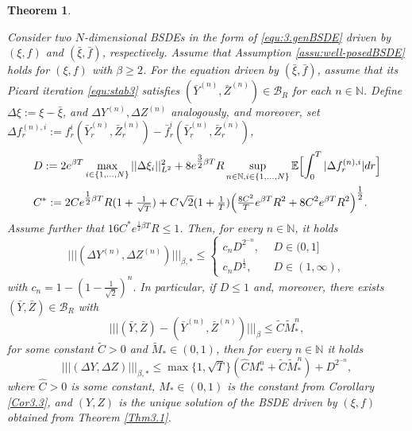 \documentclass[10pt,a4paper]{article}
\newcommand{\be}{\begin{equation}}
\newcommand{\ee}{\end{equation}}
\theoremstyle{plain}
\newtheorem{Theorem}{Theorem}[section]
\theoremstyle{definition}
\numberwithin{equation}{section}
\newcommand{\trinm}[1]{\vert\!\vert\!\vert #1 \vert\!\vert\!\vert}
\begin{document}
\begin{Theorem}
\label{Thm3.9}

Consider two $N$-dimensional BSDEs in the form of \eqref{equ:3.genBSDE} driven by $(\xi, f)$ and $(\bar \xi, \bar f)$, respectively. Assume that Assumption \ref{assu:well-posedBSDE} holds for $(\xi,f)$ with $\beta \geq 2$. For the equation driven by $(\bar \xi, \bar f)$, assume that its Picard iteration \eqref{equ:stab3} satisfies $(\bar{Y}^{(n)},\bar{Z}^{(n)}) \in \mathcal{B}_{R}$ for each $n \in \mathbb{N}$. 
Define $\Delta \xi := \xi - \bar{\xi}$, and $  \Delta Y^{(n)}, \Delta Z^{(n)}$ analogously, and moreover, set $\Delta f_{r}^{(n),i} := f_{r}^{i}(\bar{Y}_{r}^{(n)},\bar{Z}_{r}^{(n)})-\bar{f}_{r}^{i}(\bar{Y}_{r}^{(n)},\bar{Z}_{r}^{(n)})$,
\begin{align*}
&D := 2e^{\beta T}\max_{i \in \{1,...,N\}}||\Delta \xi_{i}||_{L^{2}}^{2} + 8e^{\tfrac{3}{2}\beta T}R\sup_{n \in \mathbb{N},i \in \{1,...,N\}}\mathbb{E}\Bigl[\int_{0}^{T}|\Delta f_{r}^{(n),i}|dr\Bigr] \\
&C^{*} := 2Ce^{\tfrac{1}{2}\beta T}R(1+\tfrac{1}{\sqrt{T}}) + C\sqrt{2}(1+\tfrac{1}{T})\Bigl(\tfrac{8C^{2}}{T}e^{\beta T}R^{2} + 8C^{2}e^{\beta T}R^{2}\Bigr)^{\tfrac{1}{2}}.
\end{align*}
Assume further that $16C^{*}e^{\tfrac{1}{2}\beta T}R \leq 1$. Then, for every $n \in \mathbb{N}$, it holds
\be
\trinm{(\Delta Y^{(n)}, \Delta Z^{(n)})}_{\beta,*}  \le \left\{
\begin{array}{ll}
    c_n D^{2^{-n}}, \ \ &D \in (0,1]\\
    c_n D^{\frac12}, \ \ &D \in (1,\infty), 
\end{array}\right.
\ee
with $c_n= 1-(1- \frac{1}{\sqrt 2})^n.$ In particular, if $D \leq 1$ and, moreover, there exists $(\bar Y, \bar Z) \in  \mathcal{B}_{R}$ with
\begin{equation}
\label{equ:stab5}
\trinm{(\bar{Y},\bar{Z})-(\bar{Y}^{(n)},\bar{Z}^{(n)})}_{\beta} \leq \tilde{C}\tilde{M}_{*}^{n},
\end{equation}
for some constant $\tilde{C}>0$ and $\tilde{M}_{*} \in (0,1)$,
then for every $n \in \mathbb{N}$ it holds
\[
\trinm{(\Delta Y,\Delta Z)}_{\beta,*} \leq \max\{1,\sqrt{T}\}(\hat{C}M_{*}^{n} + \tilde{C}\tilde{M}_{*}^{n}) + D^{2^{-n}},
\]
where $\hat{C}>0$ is some constant, $M_{*} \in (0,1)$ is the constant from Corollary \ref{Cor3.3}, and $(Y,Z)$ is the unique solution of the BSDE driven by $(\xi,f)$ obtained from Theorem \ref{Thm3.1}.

\end{Theorem}
\end{document}
